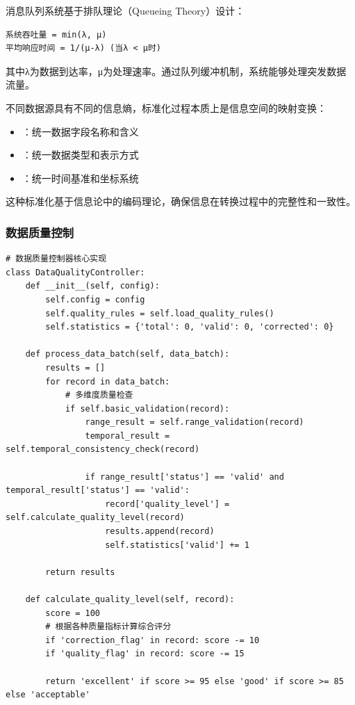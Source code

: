 
消息队列系统基于排队理论（Queueing Theory）设计：

\begin{lstlisting}
系统吞吐量 = min(λ, μ)
平均响应时间 = 1/(μ-λ) (当λ < μ时)
\end{lstlisting}

其中λ为数据到达率，μ为处理速率。通过队列缓冲机制，系统能够处理突发数据流量。


不同数据源具有不同的信息熵，标准化过程本质上是信息空间的映射变换：

\begin{itemize}
\tightlist
\item
  ：统一数据字段名称和含义
\item
  ：统一数据类型和表示方式\\
\item
  ：统一时间基准和坐标系统
\end{itemize}

这种标准化基于信息论中的编码理论，确保信息在转换过程中的完整性和一致性。

\hypertarget{ux6570ux636eux8d28ux91cfux63a7ux5236}{%
\subsubsection{数据质量控制}\label{ux6570ux636eux8d28ux91cfux63a7ux5236}}

\begin{lstlisting}[style=python]
# 数据质量控制器核心实现
class DataQualityController:
    def __init__(self, config):
        self.config = config
        self.quality_rules = self.load_quality_rules()
        self.statistics = {'total': 0, 'valid': 0, 'corrected': 0}
        
    def process_data_batch(self, data_batch):
        results = []
        for record in data_batch:
            # 多维度质量检查
            if self.basic_validation(record):
                range_result = self.range_validation(record)
                temporal_result = self.temporal_consistency_check(record)
                
                if range_result['status'] == 'valid' and temporal_result['status'] == 'valid':
                    record['quality_level'] = self.calculate_quality_level(record)
                    results.append(record)
                    self.statistics['valid'] += 1
            
        return results
    
    def calculate_quality_level(self, record):
        score = 100
        # 根据各种质量指标计算综合评分
        if 'correction_flag' in record: score -= 10
        if 'quality_flag' in record: score -= 15
        
        return 'excellent' if score >= 95 else 'good' if score >= 85 else 'acceptable'
\end{lstlisting}


